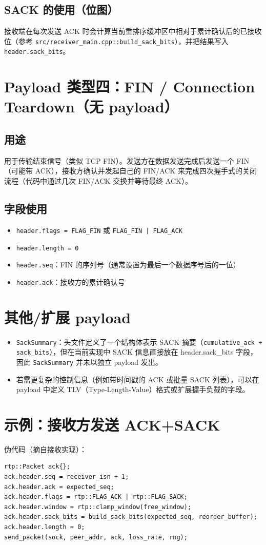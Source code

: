 \documentclass[11pt,a4paper]{article}
\begin{document}
\subsection{SACK 的使用（位图）}
接收端在每次发送 ACK 时会计算当前重排序缓冲区中相对于累计确认后的已接收位（参考 \texttt{src/receiver\_main.cpp::build\_sack\_bits}），并把结果写入 \texttt{header.sack\_bits}。

\section{Payload 类型四：FIN / Connection Teardown（无 payload）}
\subsection{用途}
用于传输结束信号（类似 TCP FIN）。发送方在数据发送完成后发送一个 FIN（可能带 ACK），接收方确认并发起自己的 FIN/ACK 来完成四次握手式的关闭流程（代码中通过几次 FIN/ACK 交换并等待最终 ACK）。

\subsection{字段使用}
\begin{itemize}
  \item \texttt{header.flags = FLAG\_FIN} 或 \texttt{FLAG\_FIN | FLAG\_ACK}
  \item \texttt{header.length = 0}
  \item \texttt{header.seq}：FIN 的序列号（通常设置为最后一个数据序号后的一位）
  \item \texttt{header.ack}：接收方的累计确认号
\end{itemize}

\section{其他/扩展 payload}
\begin{itemize}
  \item \texttt{SackSummary}：头文件定义了一个结构体表示 SACK 摘要（\texttt{cumulative\_ack + sack\_bits}），但在当前实现中 SACK 信息直接放在 header.sack\_bits 字段，因此 \texttt{SackSummary} 并未以独立 payload 发出。
  \item 若需更复杂的控制信息（例如带时间戳的 ACK 或批量 SACK 列表），可以在 payload 中定义 TLV（Type-Length-Value）格式或扩展握手负载的字段。
\end{itemize}

\section{示例：接收方发送 ACK+SACK}
伪代码（摘自接收实现）：
\begin{verbatim}
rtp::Packet ack{};
ack.header.seq = receiver_isn + 1;
ack.header.ack = expected_seq;
ack.header.flags = rtp::FLAG_ACK | rtp::FLAG_SACK;
ack.header.window = rtp::clamp_window(free_window);
ack.header.sack_bits = build_sack_bits(expected_seq, reorder_buffer);
ack.header.length = 0;
send_packet(sock, peer_addr, ack, loss_rate, rng);
\end{verbatim}
\end{document}
